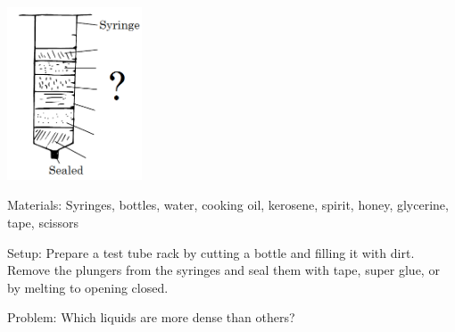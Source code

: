\begin{center}
\includegraphics[width=0.3\textwidth]{./img/density-tower-sci-meth.png}
\end{center}

\begin{description*}
\item[Materials:]{Syringes, bottles, water, cooking oil, kerosene, spirit, honey, glycerine, tape, scissors}
\item[Setup:]{Prepare a test tube rack by cutting a bottle and filling it with dirt. Remove the plungers from the syringes and seal them with tape, super glue, or by melting to opening closed.}\\
\item[Problem:]{Which liquids are more dense than others?\\

}
\end{description*}
